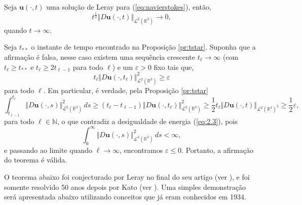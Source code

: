 \documentclass[a4paper, 11pt]{book}
\theoremstyle{definition}
\newcommand{\bN}{\mathbb{N}}
\newcommand{\bR}{\mathbb{R}}
\newcommand{\bu}{\mathbf{u}}
\newcommand{\cL}{\mathcal{L}}
\begin{document}
\begin{tbox} \label{thm:Duto0}
    Seja $\bu(\cdot,t)$ uma solução de Leray para (\ref{eq:navierstokes}), então,
    \[
        t^{\frac{1}{2}} \Vert D\bu(\cdot,t) \Vert_{\cL^2(\bR^3)} \to 0,
    \]
    quando $t \to \infty$.
\end{tbox}
\begin{prf}
    Seja $t_{**}$ o instante de tempo encontrado na Proposição \ref{pr:tstar}. Suponha que a afirmação é falsa, nesse caso existem uma sequência crescente $t_\ell \to \infty$ (com $t_\ell \geqslant t_{**}$ e $t_\ell \geqslant 2 t_{\ell -1}$ para todo $\ell$) e um $\varepsilon > 0$ fixo tais que,
    \[
        t_\ell \Vert D\bu(\cdot,t_\ell) \Vert_{\cL^2(\bR^3)}^2 \geqslant \varepsilon
    \]
    para todo $\ell$.
    Em particular, é verdade, pela Proposição \ref{pr:tstar}
    \[
        \int_{t_{\ell-1}}^{t_\ell} \Vert D\bu(\cdot,s) \Vert_{\cL^2(\bR^3)}^2 \,ds \geqslant (t_\ell - t_{\ell-1}) \Vert D\bu(\cdot,t_\ell) \Vert_{\cL^2(\bR^3)}^2 \geqslant \frac{1}{2}t_\ell \Vert D\bu(\cdot,t) \Vert_{\cL^2(\bR^3)^2} \geqslant \frac{1}{2}\varepsilon,
    \]
    para todo $\ell \in \bN$, o que contradiz a desigualdade de energia (\ref{eq:2.3}), pois
    \[
        \int_0^\infty \Vert D\bu(\cdot,s) \Vert_{\cL^2(\bR^3)}^2 \,ds < \infty,
    \]
    e passando ao limite quando $\ell \to \infty$, encontramos $\varepsilon \leqslant 0$.
    Portanto, a afirmação do teorema é válida.
\end{prf}

O teorema abaixo foi conjecturado por Leray no final do seu artigo (ver \cite{leray-fluid}), e foi somente resolvido 50 anos depois por Kato (ver \cite{kato-navier.stokes}). Uma simples demonstração será apresentada abaixo utilizando conceitos que já eram conhecidos em 1934.
\end{document}
